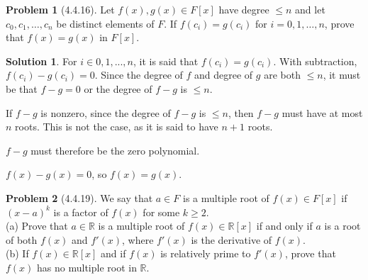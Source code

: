 \documentclass[12pt]{article}
\theoremstyle{definition}
\newtheorem*{prob}{Problem}
\newtheorem*{soln}{Solution}
\newcommand{\RR}{{\mathbb{R}}}
\begin{document}
\begin{prob}[4.4.16]
Let $f(x), g(x) \in F[x]$ have degree $\leq n$ and let 
$c_0, c_1, \dots, c_n$ be distinct elements of  $F$. If  $f(c_i) = g(c_i)$ for 
$i = 0, 1, \dots, n$, prove that $f(x) = g(x)$ in $F[x]$.
\end{prob}

\begin{soln}

For $i\in0,1,...,n$, it is said that $f(c_i)=g(c_i)$.
With subtraction, $f(c_i)-g(c_i)=0$.
Since the degree of $f$ and degree of $g$ are both $\leq n$,
it must be that $f-g=0$ or the degree of $f-g$ is $\leq n$.

If $f-g$ is nonzero,
since the degree of $f-g$ is $\leq n$,
then $f-g$ must have at most $n$ roots.
This is not the case, as it is said to have $n+1$ roots.

$f-g$ must therefore be the zero polynomial.

$f(x)-g(x)=0$, so $f(x)=g(x)$.

\end{soln}

\begin{prob}[4.4.19]
We say that $a \in F$ is a multiple root of  $f(x) \in F[x]$ if  
$(x - a)^k$ is a factor of  $f(x)$ for some $k \geq 2$. \\
(a)   Prove that $a \in \RR$ is a multiple root of  $f(x)\in \RR[x]$ 
if and only if  $a$ is a root of both $f(x)$ and $f'(x)$, where $f'(x)$ 
is the derivative of  $f(x)$.\\
(b)   If  $f(x) \in  \RR[x]$ and if $f(x)$ is relatively prime to $f'(x)$,
 prove that $f(x)$ has no multiple root in $\RR$.
\end{prob}
\end{document}
